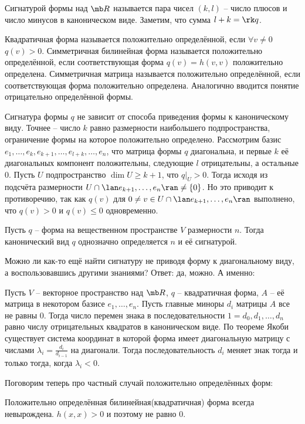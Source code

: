 \dfn Сигнатурой формы над $\mb R$ называется пара чисел $(k, l)$ -- число плюсов и число минусов в каноническом виде. Заметим, что сумма $l+k= \rk q$.
\edfn

\dfn Квадратичная форма называется положительно определённой, если $\forall v\neq 0$ $q(v)>0$. Симметричная билинейная форма называется положительно определённой, если соответствующая форма $q(v)=h(v,v)$ положительно определена. Симметричная матрица называется положительно определённой, если соответствующая форма положительно определена. Аналогично вводится понятие отрицательно определённой формы.
\edfn



\thrm Сигнатура формы $q$ не зависит от способа приведения формы к каноническому виду. Точнее -- число $k$ равно размерности наибольшего подпространства, ограничение формы  на которое положительно определено.
\proof Рассмотрим базис $e_1,\dots,e_k,e_{k+1},\dots,e_{l+k}, \dots, e_n$, что матрица формы $q$ диагональна, и первые $k$ её диагональных компонент положительны, следующие $l$ отрицательны, а остальные 0. 
Пусть $U$ подпространство $\dim U \geq k+1$, что $q|_{U}>0$. Тогда исходя из подсчёта размерности $U\cap \lan e_{k+1},\dots,e_n\ran \neq \{0\}$. Но это приводит к противоречию, так как $q(v)$ для $0\neq v \in U\cap \lan e_{k+1},\dots,e_n\ran $ выполнено, что $q(v)>0$ и $q(v)\leq 0$ одновременно.
\endproof
\ethrm

\crl Пусть $q$ -- форма на вещественном пространстве  $V$ размерности $n$. Тогда канонический вид $q$ однозначно определяется $n$ и её  сигнатурой. 
\ecrl

Можно ли как-то ещё найти сигнатуру не приводя форму к диагональному виду, а воспользовавшись другими знаниями? Ответ: да, можно. А именно:

Пусть $V$ -- векторное пространство над $\mb R$, $q$ -- квадратичная форма, $A$ -- её матрица в некотором базисе $e_1,\dots,e_n$. Пусть главные миноры  $d_i$ матрицы $A$ все не равны $0$. Тогда число перемен знака в последовательности $1=d_0,d_1,\dots,d_n$ равно числу отрицательных квадратов в каноническом виде.
\proof По теореме Якоби существует система координат в которой форма имеет диагональную матрицу с числами $\lambda_i=\frac{d_i}{d_{i-1}}$ на диагонали. Тогда последовательность $d_i$ меняет знак тогда и только тогда, когда $\lambda_i<0$.
\endproof
\ecrl

Поговорим теперь про частный случай положительно определённых форм:


\lm Положительно определённая билинейная(квадратичная) форма всегда невырождена.
\proof $h(x,x)>0$ и поэтому не равно 0.
\endproof
\elm

